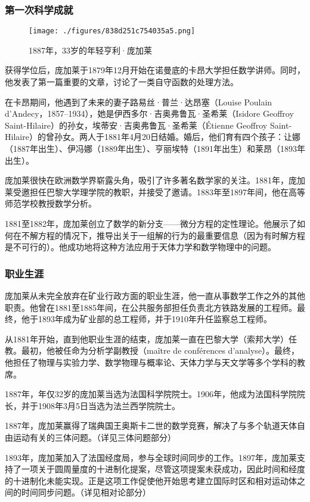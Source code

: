 \subsubsection{第一次科学成就}
\begin{figure}[ht]
\centering
\texttt{[image: ./figures/838d251c754035a5.png]}
\caption{1887年，33岁的年轻亨利·庞加莱} \label{fig_HLPJL_2}
\end{figure}
获得学位后，庞加莱于1879年12月开始在诺曼底的卡昂大学担任数学讲师。同时，他发表了第一篇重要的文章，讨论了一类自守函数的处理方法。

在卡昂期间，他遇到了未来的妻子路易丝·普兰·达昂塞（Louise Poulain d'Andecy，1857–1934），她是伊西多尔·吉奥弗鲁瓦·圣希莱（Isidore Geoffroy Saint-Hilaire）的孙女，埃蒂安·吉奥弗鲁瓦·圣希莱（Étienne Geoffroy Saint-Hilaire）的曾孙女。两人于1881年4月20日结婚。婚后，他们育有四个孩子：让娜（1887年出生）、伊冯娜（1889年出生）、亨丽埃特（1891年出生）和莱昂（1893年出生）。

庞加莱很快在欧洲数学界崭露头角，吸引了许多著名数学家的关注。1881年，庞加莱受邀担任巴黎大学理学院的教职，并接受了邀请。1883年至1897年间，他在高等师范学校教授数学分析。

1881至1882年，庞加莱创立了数学的新分支——微分方程的定性理论。他展示了如何在不解方程的情况下，推导出关于一组解的行为的最重要信息（因为有时解方程是不可行的）。他成功地将这种方法应用于天体力学和数学物理中的问题。
\subsubsection{职业生涯}
庞加莱从未完全放弃在矿业行政方面的职业生涯，他一直从事数学工作之外的其他职责。他曾在1881至1885年间，在公共服务部担任负责北方铁路发展的工程师。最终，他于1893年成为矿业部的总工程师，并于1910年升任监察总工程师。

从1881年开始，直到他职业生涯的结束，庞加莱一直在巴黎大学（索邦大学）任教。最初，他被任命为分析学副教授（maître de conférences d'analyse）。最终，他担任了物理与实验力学、数学物理与概率论、天体力学与天文学等多个学科的教席。

1887年，年仅32岁的庞加莱当选为法国科学院院士。1906年，他成为法国科学院院长，并于1908年3月5日当选为法兰西学院院士。

1887年，庞加莱赢得了瑞典国王奥斯卡二世的数学竞赛，解决了与多个轨道天体自由运动有关的三体问题。（详见三体问题部分）

1893年，庞加莱加入了法国经度局，参与全球时间同步的工作。1897年，庞加莱支持了一项关于圆周量度的十进制化提案，尽管这项提案未获成功，因此时间和经度的十进制化未能实现。正是这项工作促使他开始思考建立国际时区和相对运动体之间的时间同步问题。（详见相对论部分）

